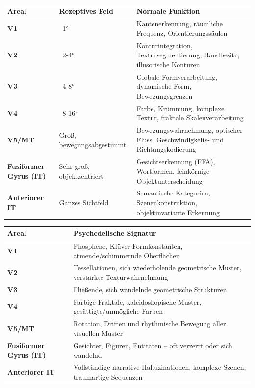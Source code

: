 \documentclass[11pt, twoside, openright]{book}
\begin{document}
\clearpage
\ifodd\value{page}\hbox{}\thispagestyle{empty}\clearpage\fi

{\scriptsize
\noindent
\begin{tabularx}{\linewidth}{>{\hsize}Y Y Y}
\toprule
\textbf{Areal} & \textbf{Rezeptives Feld} & \textbf{Normale Funktion} \\
\midrule
\textbf{V1} & ~1° & Kantenerkennung, räumliche Frequenz, Orientierungssäulen \\[3pt]
\textbf{V2} & ~2-4° & Konturintegration, Tex\-tur\-seg\-men\-tie\-rung, Randbesitz, illusorische Konturen \\[3pt]
\textbf{V3} & ~4-8° & Globale Form\-ver\-ar\-bei\-tung, dynamische Form, Be\-we\-gungs\-gren\-zen \\[3pt]
\textbf{V4} & ~8-16° & Farbe, Krümmung, komplexe Textur, fraktale Ska\-len\-ver\-ar\-bei\-tung \\[3pt]
\textbf{V5/MT} & Groß, bewegungsabgestimmt & Be\-we\-gungs\-wahr\-neh\-mung, optischer Fluss, Geschwindigkeits- und Rich\-tungs\-ko\-die\-rung \\[3pt]
\textbf{Fusiformer Gyrus (IT)} & Sehr groß, objektzentriert & Ge\-sichts\-er\-ken\-nung (FFA), Wortformen, feinkörnige Ob\-jekt\-un\-ter\-schei\-dung \\[3pt]
\textbf{Anteriorer IT} & Ganzes Sichtfeld & Semantische Kategorien, Sze\-nen\-kon\-struk\-ti\-on, objektinvariante Erkennung \\[3pt]
\bottomrule
\end{tabularx}
}
\clearpage

{\scriptsize
\noindent
\begin{tabularx}{\linewidth}{>{\hsize}Y Y}
\toprule
\textbf{Areal} & \textbf{Psychedelische Signatur} \\
\midrule
\textbf{V1} & Phosphene, Klüver-Formkonstanten, atmende/schimmernde Oberflächen \\[3pt]
\textbf{V2} & Tessellationen, sich wiederholende geometrische Muster, verstärkte Tex\-tur\-wahr\-neh\-mung \\[3pt]
\textbf{V3} & Fließende, sich wandelnde geometrische Strukturen \\[3pt]
\textbf{V4} & Farbige Fraktale, ka\-lei\-do\-sko\-pi\-sche Muster, gesättigte/unmögliche Farben \\[3pt]
\textbf{V5/MT} & Rotation, Driften und rhythmische Bewegung aller visuellen Muster \\[3pt]
\textbf{Fusiformer Gyrus (IT)} & Gesichter, Figuren, Entitäten -- oft verzerrt oder sich wandelnd \\[3pt]
\textbf{Anteriorer IT} & Vollständige narrative Hal\-lu\-zi\-na\-tio\-nen, komplexe Szenen, traumartige Sequenzen \\[3pt]
\bottomrule
\end{tabularx}
}
\end{document}
